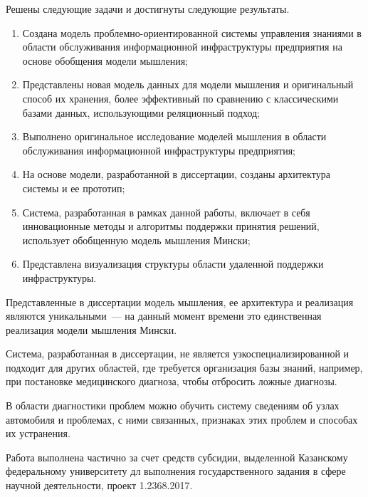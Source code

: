 
Решены следующие задачи и достигнуты следующие результаты.
\begin{enumerate}
  \item Создана модель проблемно-ориентированной системы управления знаниями в области обслуживания информационной инфраструктуры предприятия на основе обобщения модели мышления;
  \item Представлены новая модель данных для модели мышления и оригинальный способ их хранения, более эффективный по сравнению с классическими базами данных, использующими реляционный подход;
  \item Выполнено оригинальное исследование моделей мышления в области обслуживания информационной инфраструктуры предприятия;
  \item На основе модели, разработанной в диссертации, созданы архитектура системы и ее прототип; 
  \item Система, разработанная в рамках данной работы, включает в себя инновационные методы и алгоритмы поддержки принятия решений, использует обобщенную модель мышления Мински;
  \item Представлена визуализация структуры области удаленной поддержки инфраструктуры.
\end{enumerate}

Представленные в диссертации модель мышления, ее архитектура и реализация являются уникальными~--- на данный момент времени это единственная реализация модели мышления Мински. \par
Система, разработанная в диссертации, не является узкоспециализированной и подходит для других областей, где требуется организация базы знаний, например, при постановке медицинского диагноза, чтобы отбросить ложные диагнозы. \par
В области диагностики проблем можно обучить систему сведениям об узлах автомобиля и проблемах, с ними связанных, признаках этих проблем и способах их устранения. \par
Работа выполнена  частично за счет средств субсидии, выделенной Казанскому федеральному университету дл выполнения государственного задания в сфере научной деятельности, проект   1.2368.2017.




